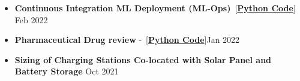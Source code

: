 \documentclass[10pt,a4paper,sans]{moderncv} %
\begin{document}
\begin{itemize}
\begin{itemize}
		
		\item \textbf{Continuous Integration ML Deployment (ML-Ops)}~[\href{https://github.com/Hadi2525/ML_production_01/tree/Hadi2525-patch-1}{\textbf{Python Code}}] \hfill Feb 2022
%		
		\item \textbf{Pharmaceutical Drug review} -~[\href{https://github.com/Hadi2525/applied_ML/blob/master/Pharma/drug_model.ipynb}{\textbf{Python Code}}]\hfill Jan 2022
		\item  \textbf{Sizing of Charging Stations Co-located with Solar Panel and Battery Storage} \hfill Oct 2021

\end{itemize}
\end{itemize}
\end{document}
